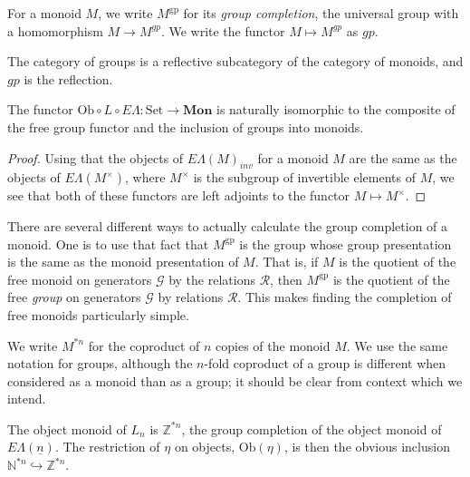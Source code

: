 \documentclass{amsbook} %
\newcommand{\mb}{\mathbf}
\newcommand{\Set}{\ensuremath{\textrm{Set}}}
\newcommand{\EL}{E\Lambda}
\newcommand{\ELn}{E\Lambda(\underline{n})}
\newcommand{\ob}{\textrm{Ob}}
\newcommand{\sets}{\Set}
\newcommand{\mon}{\ensuremath{\mb{Mon}}}
\numberwithin{section}{chapter}
\begin{document}
\begin{Defi} For a monoid $M$, we write $M^{\mathrm{gp}}$ for its \emph{group completion}, the universal group with a homomorphism $M \to M^{gp}$.  We write the functor $M \mapsto M^{gp}$ as $gp$.
\end{Defi}

\begin{rem}
The category of groups is a reflective subcategory of the category of monoids, and $gp$ is the reflection.
\end{rem}

\begin{prop}\label{oblel_fg}
The functor $\ob \circ L \circ \EL: \sets \to \mon$ is naturally isomorphic to the composite of the free group functor and the inclusion of groups into monoids.
\end{prop}
\begin{proof}
Using that the objects of $\EL(M)_{inv}$ for a monoid $M$ are the same as the objects of $\EL(M^{\times})$, where $M^{\times}$ is the subgroup of invertible elements of $M$, we see that both of these functors are left adjoints to the functor $M \mapsto M^{\times}$.
\end{proof}
There are several different ways to actually calculate the group completion of a monoid. One is to use that fact that $M^{\mathrm{gp}}$ is the group whose group presentation is the same as the monoid presentation of $M$. That is, if $M$ is the quotient of the free monoid on generators $\mathcal{G}$ by the relations $\mathcal{R}$, then $M^{\mathrm{gp}}$ is the quotient of the free \emph{group} on generators $\mathcal{G}$ by relations $\mathcal{R}$. This makes finding the completion of free monoids particularly simple.

\begin{nota}
We write $M^{*n}$ for the coproduct of $n$ copies of the monoid $M$. We use the same notation for groups, although the $n$-fold coproduct of a group is different when considered as a monoid than as a group; it should be clear from context which we intend.
\end{nota}

\begin{cor}\label{Zobj}
The object monoid of $L_n$ is $\mathbb{Z}^{*n}$, the group completion of the object monoid of $\ELn$. The restriction of $\eta$ on objects, $\mathrm{Ob}(\eta)$, is then the obvious inclusion $\mathbb{N}^{*n} \hookrightarrow \mathbb{Z}^{*n}$.
\end{cor}
\end{document}
